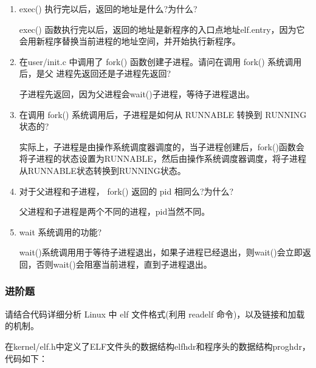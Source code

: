 \documentclass[UTF8]{article}
\begin{document}
\begin{enumerate}
    \item exec() 执行完以后，返回的地址是什么?为什么?
    
    exec() 函数执行完以后，返回的地址是新程序的入口点地址elf.entry，因为它会用新程序替换当前进程的地址空间，并开始执行新程序。
    
    \item 在user/init.c 中调用了 fork() 函数创建子进程。请问在调用 fork() 系统调用后，是父
    进程先返回还是子进程先返回?

    子进程先返回，因为父进程会wait()子进程，等待子进程退出。

    \item 在调用 fork() 系统调用后，子进程是如何从 RUNNABLE 转换到 RUNNING 状态的?
    
    实际上，子进程是由操作系统调度器调度的，当子进程创建后，fork()函数会将子进程的状态设置为RUNNABLE，然后由操作系统调度器调度，将子进程从RUNNABLE状态转换到RUNNING状态。

    \item 对于父进程和子进程， fork() 返回的 pid 相同么?为什么?
    
    父进程和子进程是两个不同的进程，pid当然不同。

    \item wait 系统调用的功能?
    
    wait()系统调用用于等待子进程退出，如果子进程已经退出，则wait()会立即返回，否则wait()会阻塞当前进程，直到子进程退出。
\end{enumerate}

\subsubsection{进阶题}

\noindent
请结合代码详细分析 Linux 中 elf 文件格式(利用 readelf 命令)，以及链接和加载的机制。

\vspace{1em}

在kernel/elf.h中定义了ELF文件头的数据结构elfhdr和程序头的数据结构proghdr，代码如下：
\end{document}
